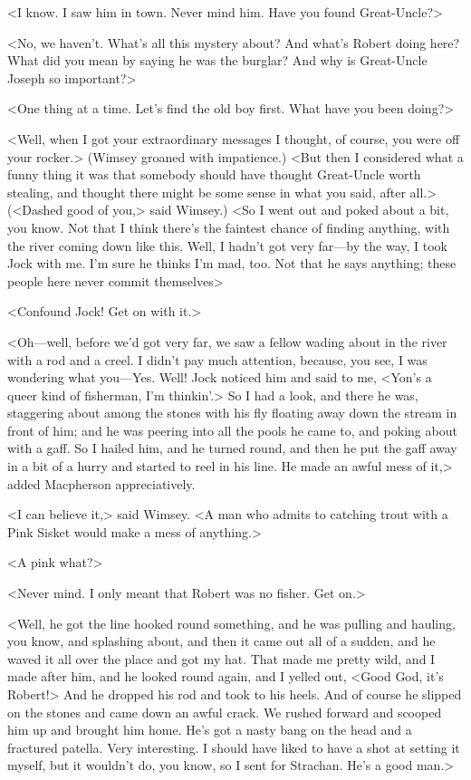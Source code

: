 <I know. I saw him in town. Never mind him. Have you found Great-Uncle?>

<No, we haven't. What's all this mystery about? And what's Robert doing here? What did you mean by saying he was the burglar? And why is Great-Uncle Joseph so important?>

<One thing at a time. Let's find the old boy first. What have you been doing?>

<Well, when I got your extraordinary messages I thought, of course, you were off your rocker.> (Wimsey groaned with impatience.) <But then I considered what a funny thing it was that somebody should have thought Great-Uncle worth stealing, and thought there might be some sense in what you said, after all.> (<Dashed good of you,> said Wimsey.) <So I went out and poked about a bit, you know. Not that I think there's the faintest chance of finding anything, with the river coming down like this. Well, I hadn't got very far—by the way, I took Jock with me. I'm sure he thinks I'm mad, too. Not that he says anything; these people here never commit themselves\longdash>

<Confound Jock! Get on with it.>

<Oh—well, before we'd got very far, we saw a fellow wading about in the river with a rod and a creel. I didn't pay much attention, because, you see, I was wondering what you—Yes. Well! Jock noticed him and said to me, <Yon's a queer kind of fisherman, I'm thinkin'.> So I had a look, and there he was, staggering about among the stones with his fly floating away down the stream in front of him; and he was peering into all the pools he came to, and poking about with a gaff. So I hailed him, and he turned round, and then he put the gaff away in a bit of a hurry and started to reel in his line. He made an awful mess of it,> added Macpherson appreciatively.

<I can believe it,> said Wimsey. <A man who admits to catching trout with a Pink Sisket would make a mess of anything.>

<A pink what?>

<Never mind. I only meant that Robert was no fisher. Get on.>

<Well, he got the line hooked round something, and he was pulling and hauling, you know, and splashing about, and then it came out all of a sudden, and he waved it all over the place and got my hat. That made me pretty wild, and I made after him, and he looked round again, and I yelled out, <Good God, it's Robert!> And he dropped his rod and took to his heels. And of course he slipped on the stones and came down an awful crack. We rushed forward and scooped him up and brought him home. He's got a nasty bang on the head and a fractured patella. Very interesting. I should have liked to have a shot at setting it myself, but it wouldn't do, you know, so I sent for Strachan. He's a good man.>

